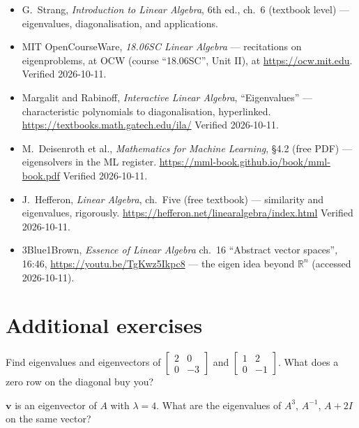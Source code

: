 \begin{itemize}
\item G.~Strang, \emph{Introduction to Linear Algebra}, 6th ed., ch.~6
(textbook level) --- eigenvalues, diagonalisation, and applications.
\item MIT OpenCourseWare, \emph{18.06SC Linear Algebra} --- recitations
on eigenproblems, at OCW (course ``18.06SC'', Unit II), at
\url{https://ocw.mit.edu}. Verified 2026-10-11.
\item Margalit and Rabinoff, \emph{Interactive Linear Algebra},
``Eigenvalues'' --- characteristic polynomials to diagonalisation,
hyperlinked. \newline
\url{https://textbooks.math.gatech.edu/ila/}
Verified 2026-10-11.
\item M.~Deisenroth et al., \emph{Mathematics for Machine Learning},
\S4.2 (free PDF) --- eigensolvers in the ML register.\newline
\url{https://mml-book.github.io/book/mml-book.pdf}
Verified 2026-10-11.
\item J.~Hefferon, \emph{Linear Algebra}, ch.~Five (free textbook) ---
similarity and eigenvalues, rigorously.\newline
\url{https://hefferon.net/linearalgebra/index.html}
Verified 2026-10-11.
\item 3Blue1Brown, \emph{Essence of Linear Algebra} ch.~16 ``Abstract
vector spaces'', 16:46, \url{https://youtu.be/TgKwz5Ikpc8} --- the
eigen idea beyond $\mathbb{R}^n$ (accessed 2026-10-11).
\end{itemize}

\section*{Additional exercises}

\begin{exercise}[easy]
Find eigenvalues and eigenvectors of
$\begin{bmatrix}2&0\\0&-3\end{bmatrix}$ and
$\begin{bmatrix}1&2\\0&-1\end{bmatrix}$. What does a zero row on the
diagonal buy you?
\end{exercise}

\begin{exercise}[easy]
$\mathbf v$ is an eigenvector of $A$ with $\lambda=4$. What are the
eigenvalues of $A^{3}$, $A^{-1}$, $A+2I$ on the same vector?
\end{exercise}

